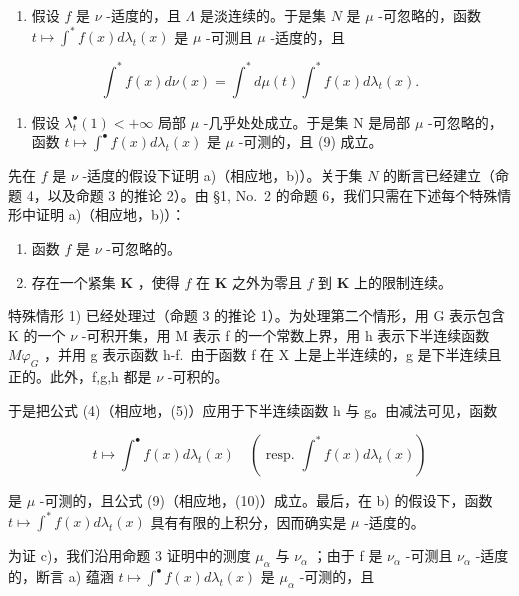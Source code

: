 \begin{enumerate}
\def\labelenumi{\alph{enumi})}
\setcounter{enumi}{1}
\tightlist
\item
  假设 \(f\) 是 \(\nu\) -适度的，且 \(\Lambda\) 是淡连续的。于是集 \(N\) 是 \(\mu\) -可忽略的，函数 \(t \mapsto \int^{*} f(x) d\lambda_{t}(x)\) 是 \(\mu\) -可测且 \(\mu\) -适度的，且
\end{enumerate}

\[
\int^ {*} f (x) d \nu (x) = \int^ {*} d \mu (t) \int^ {*} f (x) d \lambda_ {t} (x).\tag{10}
\]

\begin{enumerate}
\def\labelenumi{\alph{enumi})}
\setcounter{enumi}{2}
\tightlist
\item
  假设 \(\lambda_t^\bullet(1) < +\infty\) 局部 \(\mu\) -几乎处处成立。于是集 N 是局部 \(\mu\) -可忽略的，函数 \(t \mapsto \int^\bullet f(x) d\lambda_t(x)\) 是 \(\mu\) -可测的，且 (9) 成立。
\end{enumerate}

先在 \(f\) 是 \(\nu\) -适度的假设下证明 a)（相应地，b)）。关于集 \(N\) 的断言已经建立（命题 4，以及命题 3 的推论 2）。由 §1, No.~2 的命题 6，我们只需在下述每个特殊情形中证明 a)（相应地，b)）：

\begin{enumerate}
\def\labelenumi{\arabic{enumi})}
\item
  函数 \(f\) 是 \(\nu\) -可忽略的。
\item
  存在一个紧集 \(\mathbf{K}\) ，使得 \(f\) 在 \(\mathbf{K}\) 之外为零且 \(f\) 到 \(\mathbf{K}\) 上的限制连续。
\end{enumerate}

特殊情形 1) 已经处理过（命题 3 的推论 1）。为处理第二个情形，用 G 表示包含 K 的一个 \(\nu\) -可积开集，用 M 表示 f 的一个常数上界，用 h 表示下半连续函数 \(M\varphi_{G}\) ，并用 g 表示函数 h-f.~由于函数 f 在 X 上是上半连续的，g 是下半连续且正的。此外，f,g,h 都是 \(\nu\) -可积的。

于是把公式 (4)（相应地，(5)）应用于下半连续函数 h 与 g。由减法可见，函数

\[
t \mapsto \int^ {\bullet} f (x) d \lambda_ {t} (x) \quad (\text { resp. } \int^ {*} f (x) d \lambda_ {t} (x))
\]

是 \(\mu\) -可测的，且公式 (9)（相应地，(10)）成立。最后，在 b) 的假设下，函数 \(t \mapsto \int^{*} f(x) d\lambda_{t}(x)\) 具有有限的上积分，因而确实是 \(\mu\) -适度的。

为证 c)，我们沿用命题 3 证明中的测度 \(\mu_{\alpha}\) 与 \(\nu_{\alpha}\) ；由于 f 是 \(\nu_{\alpha}\) -可测且 \(\nu_{\alpha}\) -适度的，断言 a) 蕴涵 \(t \mapsto \int^{\bullet} f(x) d\lambda_{t}(x)\) 是 \(\mu_{\alpha}\) -可测的，且

